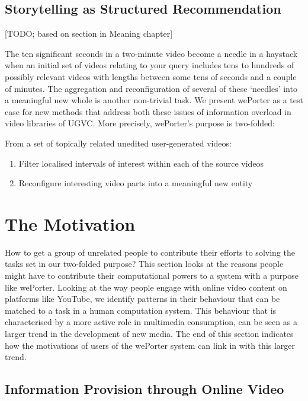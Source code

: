 \subsection{Storytelling as Structured Recommendation}

[TODO; based on section in Meaning chapter]

The ten significant seconds in a two-minute video become a needle in a haystack when an initial set of videos relating to your query includes tens to hundreds of possibly relevant videos with lengths between some tens of seconds and a couple of minutes. The aggregation and reconfiguration of several of these `needles' into a meaningful new whole is another non-trivial task. We present wePorter as a test case for new methods that address both these issues of information overload in video libraries of UGVC. More precisely, wePorter's purpose is two-folded:

From a set of topically related unedited user-generated videos:
\begin{enumerate}
  \item Filter localised intervals of interest within each of the source videos
  \item Reconfigure interesting video parts into a meaningful new entity
\end{enumerate}		

\section{The Motivation}

How to get a group of unrelated people to contribute their efforts to solving the tasks set in our two-folded purpose? This section looks at the reasons people might have to contribute their computational powers to a system with a purpose like wePorter. Looking at the way people engage with online video content on platforms like YouTube, we identify patterns in their behaviour that can be matched to a task in a human computation system. This behaviour that is characterised by a more active role in multimedia consumption, can be seen as a larger trend in the development of new media. The end of this section indicates how the motivations of users of the wePorter system can link in with this larger trend. 

\subsection{Information Provision through Online Video}

